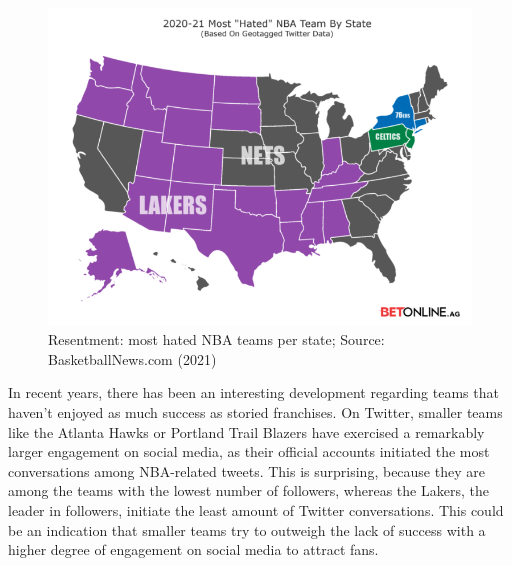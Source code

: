 \documentclass[
]{article}
\begin{document}
\begin{figure}

{\centering \includegraphics[width=10.35in,height=0.4\textheight]{../output/Figure 3 - 2020-21 Most Hated NBA Team By State (BasketballNews 2021)} 

}

\caption{Resentment: most hated NBA teams per state; Source: BasketballNews.com (2021)}\label{fig:unnamed-chunk-3}
\end{figure}

In recent years, there has been an interesting development regarding
teams that haven't enjoyed as much success as storied franchises. On
Twitter, smaller teams like the Atlanta Hawks or Portland Trail Blazers
have exercised a remarkably larger engagement on social media, as their
official accounts initiated the most conversations among NBA-related
tweets. This is surprising, because they are among the teams with the
lowest number of followers, whereas the Lakers, the leader in followers,
initiate the least amount of Twitter conversations. This could be an
indication that smaller teams try to outweigh the lack of success with a
higher degree of engagement on social media to attract fans.
\end{document}
